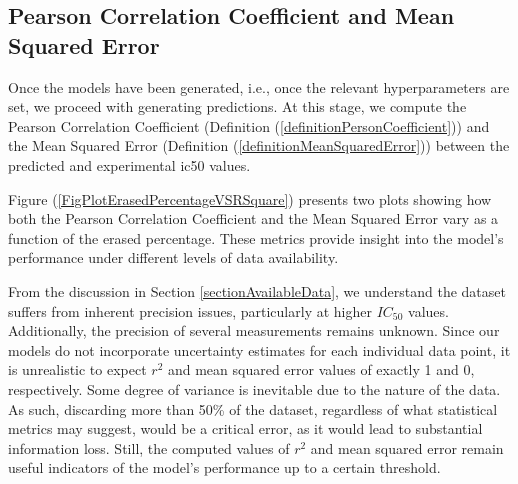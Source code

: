 \documentclass[11pt]{article}
\begin{document}
\subsection{Pearson Correlation Coefficient and Mean Squared Error}\label{sectionPersonCorrelationFactor}

Once the models have been generated, i.e., once the relevant hyperparameters are set, we proceed with generating predictions. At this stage, we compute the Pearson Correlation Coefficient (Definition (\ref{definitionPersonCoefficient})) and the Mean Squared Error (Definition (\ref{definitionMeanSquaredError})) between the predicted and experimental \gls{ic50} values.

Figure (\ref{FigPlotErasedPercentageVSRSquare}) presents two plots showing how both the Pearson Correlation Coefficient and the Mean Squared Error vary as a function of the erased percentage. These metrics provide insight into the model’s performance under different levels of data availability.

From the discussion in Section \ref{sectionAvailableData}, we understand the dataset suffers from inherent precision issues, particularly at higher $IC_{50}$ values. Additionally, the precision of several measurements remains unknown. Since our models do not incorporate uncertainty estimates for each individual data point, it is unrealistic to expect $r^2$ and mean squared error values of exactly 1 and 0, respectively. Some degree of variance is inevitable due to the nature of the data. As such, discarding more than 50\% of the dataset, regardless of what statistical metrics may suggest, would be a critical error, as it would lead to substantial information loss. Still, the computed values of $r^2$ and mean squared error remain useful indicators of the model's performance up to a certain threshold.
\end{document}
